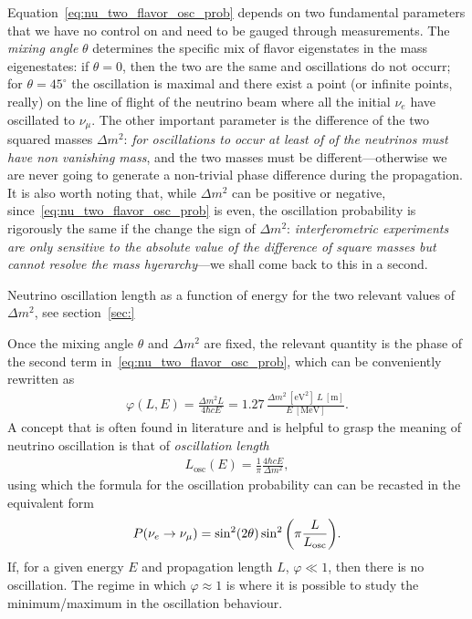 Equation~\eqref{eq:nu_two_flavor_osc_prob} depends on two fundamental parameters
that we have no control on and need to be gauged through measurements. The
\emph{mixing angle} $\theta$ determines the specific mix of flavor eigenstates in
the mass eigenestates: if $\theta = 0$, then the two are the same and oscillations
do not occurr; for $\theta = 45^\circ$ the oscillation is maximal and there exist
a point (or infinite points, really) on the line of flight of the neutrino beam
where all the initial $\nu_e$ have oscillated to $\nu_\mu$. The other important
parameter is the difference of the two squared masses $\Delta m^2$: \emph{for oscillations
to occur at least of of the neutrinos must have non vanishing mass}, and
the two masses must be different---otherwise we are never going to generate a
non-trivial phase difference during the propagation. It is also worth noting that,
while $\Delta m^2$ can be positive or negative, since~\eqref{eq:nu_two_flavor_osc_prob}
is even, the oscillation probability is rigorously the same if the change the sign
of $\Delta m^2$: \emph{interferometric experiments are only sensitive to the absolute value
of the difference of square masses but cannot resolve the mass hyerarchy}---we shall
come back to this in a second.

\begin{marginfigure}
  
  \caption{Neutrino oscillation length as a function of energy for the two relevant
  values of $\Delta m^2$, see section~\ref{sec:}}
  \label{fig:nu_oscillation_length}
\end{marginfigure}

Once the mixing angle $\theta$ and $\Delta m^2$ are fixed, the relevant quantity
is the phase of the second term in~\eqref{eq:nu_two_flavor_osc_prob}, which
can be conveniently rewritten as
\begin{align}
  \varphi(L, E) = \frac{\Delta m^2 L}{4 \hbar c E} =
  1.27\, \frac{\Delta m^2~[\text{eV}^2]~L~[\text{m}]}{E~[\text{MeV}]}.
\end{align}
A concept that is often found in literature and is helpful to grasp the meaning of
neutrino oscillation is that of \emph{oscillation length}
\begin{align*}
  L_\text{osc}(E) = \frac{1}{\pi} \frac{4\hbar c E}{\Delta m^2},
\end{align*}
using which the formula for the oscillation probability can can be recasted in the
equivalent form
\begin{align*}
  P(\nu_e \rightarrow \nu_\mu) =\sin^2(2\theta)\sin^2 \qty(\pi \frac{L}{L_\text{osc}}).
\end{align*}
If, for a given energy $E$ and propagation length $L$, $\varphi \ll 1$, then there
is no oscillation. The regime in which $\varphi \approx 1$ is where it is possible
to study the minimum/maximum in the oscillation behaviour.

